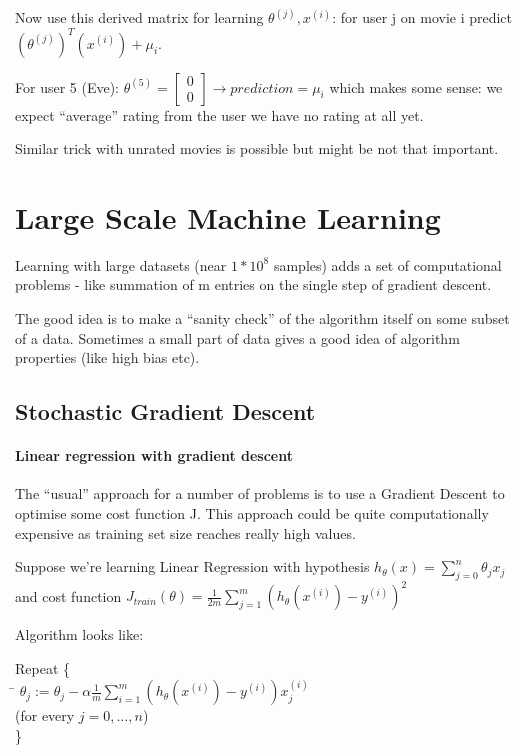\documentclass{scrartcl}
\begin{document}
Now use this derived matrix for learning $\theta^{(j)}, x^{(i)}$: for
user j on movie i predict $(\theta^{(j)})^T (x^{(i)}) + \mu_i$.

For user 5 (Eve): $\theta^{(5)} = \left[ \begin{array}{c}  0 \\
    0 \end{array} \right] \to prediction = \mu_i $ which makes some
sense: we expect ``average'' rating from the user we have no rating at
all yet.

Similar trick with unrated movies is possible but might be not that
important.

\section{Large Scale Machine Learning}
\label{sec:17}

Learning with large datasets (near $1 * 10^8$ samples) adds a set of
computational problems - like summation of m entries on the single
step of gradient descent.

The good idea is to make a ``sanity check'' of the algorithm itself on
some subset of a data. Sometimes a small part of data gives a good
idea of algorithm properties (like high bias etc).

\subsection{Stochastic Gradient Descent}
\label{sec:17-2}

\paragraph{Linear regression with gradient descent}

The ``usual'' approach for a number of problems is to use a Gradient
Descent to optimise some cost function J. This approach could be quite
computationally expensive as training set size reaches really high
values.

Suppose we're learning Linear Regression with hypothesis $h_\theta(x)
= \sum \limits_{j=0}^n \theta_{j} x_{j}$ and cost function
$J_{train}(\theta) = \frac{1}{2m}\sum
\limits_{j=1}^m(h_\theta(x^{(i)}) - y^{(i)})^2$

Algorithm looks like:
\begin{tabbing}
  Repeat \{    \\
  \quad \quad \= $\theta_j := \theta_j - \alpha \frac{1}{m} \sum
  \limits_{i=1}^m(h_\theta(x^{(i)}) - y^{(i)})x_j^{(i)} $ \\
  \quad \quad \> (for every $j = 0, \dots, n$) \\
  \}
\end{tabbing}
\end{document}
